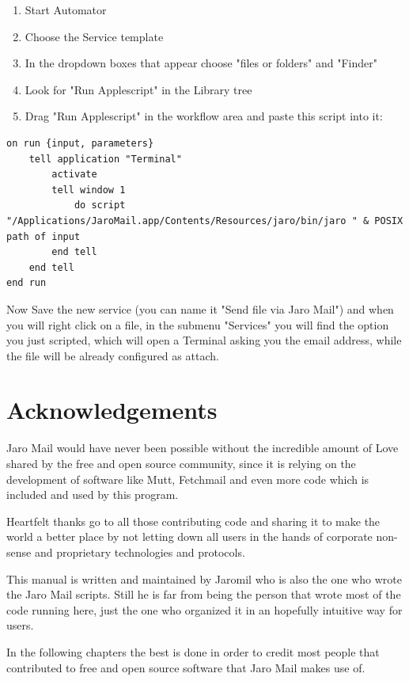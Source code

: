 \documentclass[a4,onecolumn,portrait]{article}
\begin{document}
\begin{enumerate}
\item Start Automator
\item Choose the Service template
\item In the dropdown boxes that appear choose "files or folders" and "Finder"
\item Look for "Run Applescript" in the Library tree
\item Drag "Run Applescript" in the workflow area and paste this script into it:
\end{enumerate}

\begin{verbatim}
on run {input, parameters}
	tell application "Terminal"
		activate
		tell window 1
			do script "/Applications/JaroMail.app/Contents/Resources/jaro/bin/jaro " & POSIX path of input
		end tell
	end tell
end run
\end{verbatim}

Now Save the new service (you can name it "Send file via Jaro
Mail") and when you will right click on a file, in the submenu
"Services" you will find the option you just scripted, which will
open a Terminal asking you the email address, while the file will
be already configured as attach.



\section{Acknowledgements}
\label{sec-11}

Jaro Mail would have never been possible without the incredible amount
of Love shared by the free and open source community, since it is
relying on the development of software like Mutt, Fetchmail and even
more code which is included and used by this program.

Heartfelt thanks go to all those contributing code and sharing it to
make the world a better place by not letting down all users in the
hands of corporate non-sense and proprietary technologies and
protocols.

This manual is written and maintained by Jaromil who is also the one
who wrote the Jaro Mail scripts. Still he is far from being the person
that wrote most of the code running here, just the one who organized
it in an hopefully intuitive way for users.

In the following chapters the best is done in order to credit most
people that contributed to free and open source software that Jaro
Mail makes use of.
\end{document}
